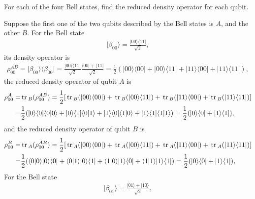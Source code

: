 \documentclass[en]{sol-man}
\begin{document}
\begin{exe}
    For each of the four Bell states, find the reduced density operator for each qubit.
\end{exe}
\begin{sol}
    Suppose the first one of the two qubits described by the Bell states is $A$, and the other $B$.
    For the Bell state
    \begin{align}
        \lvert\beta_{00}\rangle=\frac{\lvert 00\rangle\langle 11\rvert}{\sqrt{2}},
    \end{align}
    its density operator is
    \begin{align}
        \rho_{00}^{AB}=\lvert\beta_{00}\rangle\langle\beta_{00}\rvert=\frac{\lvert 00\rangle\langle 11\rvert}{\sqrt{2}}\frac{\langle 00\rvert+\langle 11\rvert}{\sqrt{2}}=\frac{1}{2}(\lvert 00\rangle\langle 00\rvert+\lvert 00\rangle\langle 11\rvert+\lvert 11\rangle\langle 00\rvert+\lvert 11\rangle\langle 11\rvert),
    \end{align}
    the reduced density operator of qubit $A$ is
    \begin{align}
        \notag\rho_{00}^A=&\,\mathrm{tr}\,_B(\rho_{00}^{AB})=\frac{1}{2}[\,\mathrm{tr}\,_B(\lvert 00\rangle\langle 00\rvert)+\,\mathrm{tr}\,_B(\lvert 00\rangle\langle 11\rvert)+\,\mathrm{tr}\,_B(\lvert 11\rangle\langle 00\rvert)+\,\mathrm{tr}\,_B(\lvert 11\rangle\langle 11\rvert)]\\
        \notag=&\frac{1}{2}(\lvert 0\rangle\langle 0\rvert\langle 0\vert 0\rangle+\lvert 0\rangle\langle 1\rvert\langle 0\vert 1\rangle+\lvert 1\rangle\langle 0\rvert\langle 1\vert 0\rangle+\lvert 1\rangle\langle 1\rvert\langle 1\vert 1\rangle)=\frac{1}{2}(\lvert 0\rangle\langle 0\rvert+\lvert 1\rangle\langle 1\rvert),
    \end{align}
    and the reduced density operator of qubit $B$ is
    \begin{align}
        \notag\rho_{00}^B=&\,\mathrm{tr}\,_A(\rho_{00}^{AB})=\frac{1}{2}[\,\mathrm{tr}\,_A(\lvert 00\rangle\langle 00\rvert)+\,\mathrm{tr}\,_A(\lvert 00\rangle\langle 11\rvert)+\,\mathrm{tr}\,_A(\lvert 11\rangle\langle 00\rvert)+\,\mathrm{tr}\,_A(\lvert 11\rangle\langle 11\rvert)]\\
        =&\frac{1}{2}(\langle 0\vert 0\rangle\lvert 0\rangle\langle 0\rvert+\langle 0\vert 1\rangle\lvert 0\rangle\langle 1\rvert+\langle 1\vert 0\rangle\lvert 1\rangle\langle 0\rvert+\langle 1\vert 1\rangle\lvert 1\rangle\langle 1\rvert)=\frac{1}{2}(\lvert 0\rangle\langle 0\rvert+\lvert 1\rangle\langle 1\rvert),
    \end{align}
    For the Bell state
    \begin{align}
        \lvert\beta_{01}\rangle=\frac{\lvert 01\rangle+\lvert 10\rangle}{\sqrt{2}},

\end{align}
\end{sol}
\end{document}
